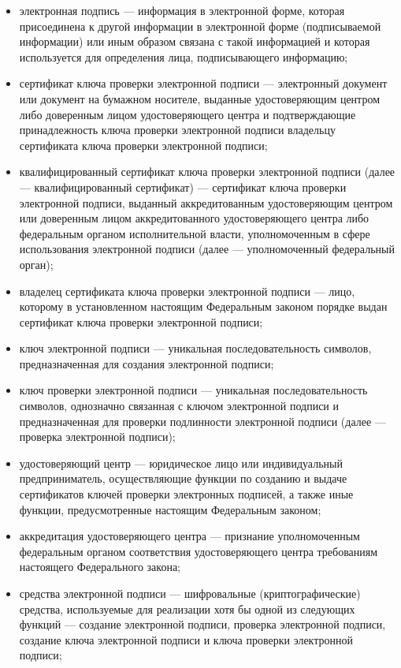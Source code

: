 \begin{itemize}
	\item электронная подпись --- информация в электронной форме, которая присоединена к другой информации в электронной форме (подписываемой информации) или иным образом связана с такой информацией и которая используется для определения лица, подписывающего информацию;
	\item сертификат ключа проверки электронной подписи --- электронный документ или документ на бумажном носителе, выданные удостоверяющим центром либо доверенным лицом удостоверяющего центра и подтверждающие принадлежность ключа проверки электронной подписи владельцу сертификата ключа проверки электронной подписи;
	\item квалифицированный сертификат ключа проверки электронной подписи (далее --- квалифицированный сертификат) --- сертификат ключа проверки электронной подписи, выданный аккредитованным удостоверяющим центром или доверенным лицом аккредитованного удостоверяющего центра либо федеральным органом исполнительной власти, уполномоченным в сфере использования электронной подписи (далее --- уполномоченный федеральный орган);
	\item владелец сертификата ключа проверки электронной подписи --- лицо, которому в установленном настоящим Федеральным законом порядке выдан сертификат ключа проверки электронной подписи;
	\item ключ электронной подписи --- уникальная последовательность символов, предназначенная для создания электронной подписи;
	\item ключ проверки электронной подписи --- уникальная последовательность символов, однозначно связанная с ключом электронной подписи и предназначенная для проверки подлинности электронной подписи (далее --- проверка электронной подписи);
	\item удостоверяющий центр --- юридическое лицо или индивидуальный предприниматель, осуществляющие функции по созданию и выдаче сертификатов ключей проверки электронных подписей, а также иные функции, предусмотренные настоящим Федеральным законом;
	\item аккредитация удостоверяющего центра --- признание уполномоченным федеральным органом соответствия удостоверяющего центра требованиям настоящего Федерального закона;
	\item средства электронной подписи --- шифровальные (криптографические) средства, используемые для реализации хотя бы одной из следующих функций --- создание электронной подписи, проверка электронной подписи, создание ключа электронной подписи и ключа проверки электронной подписи;

\end{itemize}
